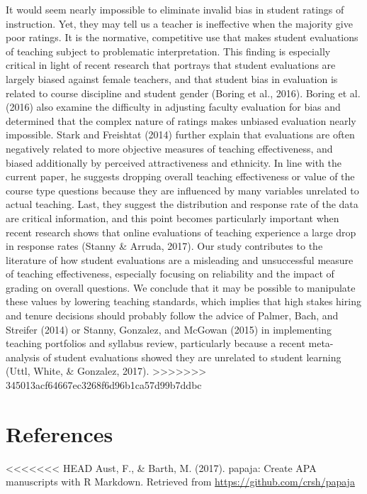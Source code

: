 \documentclass[man]{apa6}
\theoremstyle{definition}
\theoremstyle{definition}
\theoremstyle{definition}
\theoremstyle{remark}
\begin{document}
It would seem nearly impossible to eliminate invalid bias in student ratings of instruction. Yet, they may tell us a teacher is ineffective when the majority give poor ratings. It is the normative, competitive use that makes student evaluations of teaching subject to problematic interpretation. This finding is especially critical in light of recent research that portrays that student evaluations are largely biased against female teachers, and that student bias in evaluation is related to course discipline and student gender (Boring et al., 2016). Boring et al. (2016) also examine the difficulty in adjusting faculty evaluation for bias and determined that the complex nature of ratings makes unbiased evaluation nearly impossible. Stark and Freishtat (2014) further explain that evaluations are often negatively related to more objective measures of teaching effectiveness, and biased additionally by perceived attractiveness and ethnicity. In line with the current paper, he suggests dropping overall teaching effectiveness or value of the course type questions because they are influenced by many variables unrelated to actual teaching. Last, they suggest the distribution and response rate of the data are critical information, and this point becomes particularly important when recent research shows that online evaluations of teaching experience a large drop in response rates (Stanny \& Arruda, 2017). Our study contributes to the literature of how student evaluations are a misleading and unsuccessful measure of teaching effectiveness, especially focusing on reliability and the impact of grading on overall questions. We conclude that it may be possible to manipulate these values by lowering teaching standards, which implies that high stakes hiring and tenure decisions should probably follow the advice of Palmer, Bach, and Streifer (2014) or Stanny, Gonzalez, and McGowan (2015) in implementing teaching portfolios and syllabus review, particularly because a recent meta-analysis of student evaluations showed they are unrelated to student learning (Uttl, White, \& Gonzalez, 2017).
>>>>>>> 345013acf64667ec3268f6d96b1ca57d99b7ddbc

\newpage

\section{References}\label{references}

\setlength{\parindent}{-0.5in} \setlength{\leftskip}{0.5in}

\hypertarget{refs}{}
<<<<<<< HEAD
\hypertarget{ref-Aust2017}{}
Aust, F., \& Barth, M. (2017). papaja: Create APA manuscripts with R
Markdown. Retrieved from \url{https://github.com/crsh/papaja}
\end{document}

